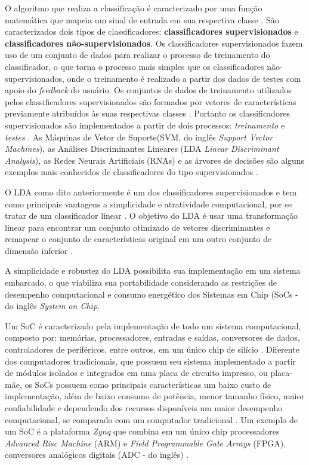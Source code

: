 O algoritmo que realiza a classificação é caracterizado por uma função matemática que mapeia um sinal de entrada em sua respectiva classe \cite{lottephd}. São caracterizados dois tipos de classificadores: \textbf{classificadores supervisionados} e \textbf{classificadores não-supervisionados}. Os classificadores supervisionados fazem uso de um conjunto de dados para realizar o processo de treinamento do classificador, o que torna o processo mais simples que os classificadores não-supervisionados, onde o treinamento é realizado a partir dos dados de testes com apoio do \textit{feedback} do usuário. Os conjuntos de dados de treinamento utilizados pelos classificadores supervisionados são formados por vetores de características previamente atribuídos às suas respectivas classes \cite{lottephd}. Portanto os classificadores supervisionados são implementados a partir de dois processos: \textit{treinamento} e \textit{testes} \cite{Siulybook}. As Máquinas de Vetor de Suporte(SVM, do inglês \textit{Support Vector Machines}), as Análises Discriminantes Lineares (LDA \textit{Linear Discriminant Analysis}), as Redes Neurais Artificiais (RNAs) e as árvores de decisões são alguns exemplos mais conhecidos de classificadores do tipo supervisionados \cite{Siulybook}.

O LDA como dito anteriormente é um dos classificadores supervisionados e tem como principais vantagens a simplicidade e atratividade computacional, por se tratar de um classificador linear \cite{patternRecogn}. O objetivo do LDA é usar uma transformação linear para encontrar um conjunto otimizado de vetores
discriminantes e remapear o conjunto de características original em um outro conjunto de dimensão  inferior \cite{ShashoaLDA}.

A simplicidade e robustez do LDA possibilita sua implementação em um sistema embarcado, o que viabiliza sua portabilidade considerando as restrições de desempenho computacional e consumo energético dos Sistemas em Chip (SoCs - do inglês \textit{System on Chip}.

Um SoC é caracterizado pela implementação de todo um sistema computacional, composto por: memórias, processadores, entradas e saídas, conversores de dados, controladores de periféricos, entre outros, em um único chip de silício \cite{zynqBook}. Diferente dos computadores tradicionais, que possuem seu sistema implementado a partir de módulos isolados e integrados em uma placa de circuito impresso, ou placa-mãe, os SoCs possuem como principais características um baixo custo de implementação, além de baixo consumo de potência, menor tamanho físico, maior confiabilidade e dependendo dos recursos disponíveis um maior desempenho computacional, se comparado com um computador tradicional \cite{zynqBook}. Um exemplo de um SoC é a plataforma \textit{Zynq} que combina em um único chip processadores \textit{Advanced Risc Machine} (ARM) e \textit{Field Programmable Gate Arrays} (FPGA), conversores analógicos digitais (ADC - do inglês) \cite{zynqBook}. 

